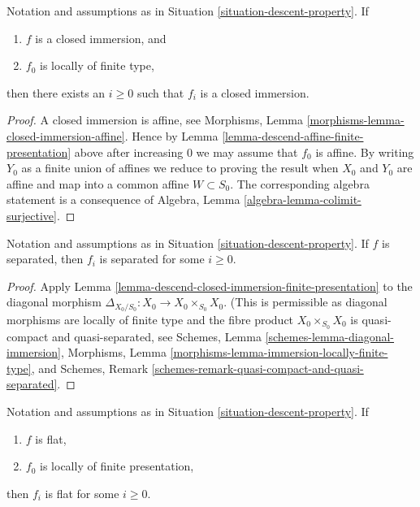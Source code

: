 \begin{lemma}
\label{lemma-descend-closed-immersion-finite-presentation}
Notation and assumptions as in Situation \ref{situation-descent-property}.
If
\begin{enumerate}
\item $f$ is a closed immersion, and
\item $f_0$ is locally of finite type,
\end{enumerate}
then there exists an $i \geq 0$ such that $f_i$ is a closed immersion.
\end{lemma}

\begin{proof}
A closed immersion is affine, see
Morphisms, Lemma \ref{morphisms-lemma-closed-immersion-affine}.
Hence by Lemma \ref{lemma-descend-affine-finite-presentation} above
after increasing $0$ we may assume that $f_0$ is affine.
By writing $Y_0$ as a finite union of affines we reduce to proving
the result when $X_0$ and $Y_0$ are affine and map
into a common affine $W \subset S_0$. The corresponding algebra
statement is a consequence of
Algebra, Lemma \ref{algebra-lemma-colimit-surjective}.
\end{proof}

\begin{lemma}
\label{lemma-descend-separated-finite-presentation}
Notation and assumptions as in Situation \ref{situation-descent-property}.
If $f$ is separated, then $f_i$ is separated for some $i \geq 0$.
\end{lemma}

\begin{proof}
Apply Lemma \ref{lemma-descend-closed-immersion-finite-presentation}
to the diagonal morphism $\Delta_{X_0/S_0} : X_0 \to X_0 \times_{S_0} X_0$.
(This is permissible as diagonal morphisms are locally of finite type
and the fibre product $X_0 \times_{S_0} X_0$ is quasi-compact and
quasi-separated, see
Schemes, Lemma \ref{schemes-lemma-diagonal-immersion},
Morphisms, Lemma \ref{morphisms-lemma-immersion-locally-finite-type}, and
Schemes, Remark \ref{schemes-remark-quasi-compact-and-quasi-separated}.
\end{proof}

\begin{lemma}
\label{lemma-descend-flat-finite-presentation}
Notation and assumptions as in Situation \ref{situation-descent-property}.
If
\begin{enumerate}
\item $f$ is flat,
\item $f_0$ is locally of finite presentation,
\end{enumerate}
then $f_i$ is flat for some $i \geq 0$.
\end{lemma}

